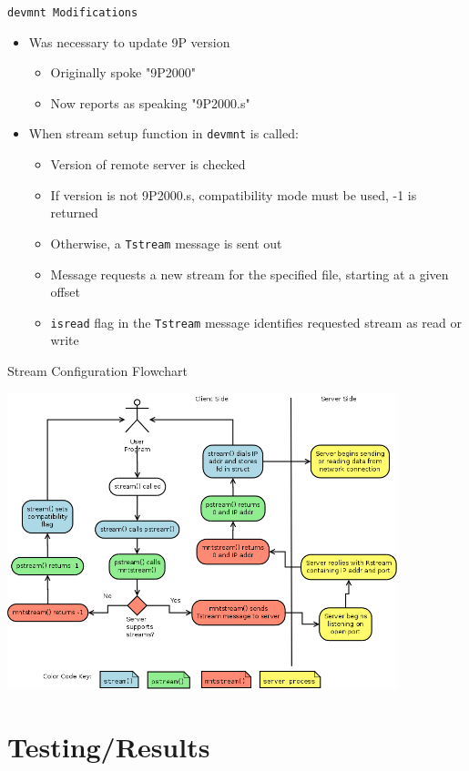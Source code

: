 \documentclass[11pt,compress]{beamer}
\begin{document}
\begin{frame}{\tt devmnt Modifications}
\begin{itemize}
	\item Was necessary to update 9P version
	\begin{itemize}
		\item Originally spoke "9P2000"
		\item Now reports as speaking "9P2000.s"
	\end{itemize}
	\item When stream setup function in {\tt devmnt} is called:
	\begin{itemize}
		\item Version of remote server is checked
		\item If version is not 9P2000.s, compatibility mode must be used, -1 is returned
		\item Otherwise, a {\tt Tstream} message is sent out
		\item Message requests a new stream for the specified file, starting at a given offset
		\item {\tt isread} flag in the {\tt Tstream} message identifies requested stream as read or write
	\end{itemize}
\end{itemize}
\end{frame}

\begin{frame}{Stream Configuration Flowchart}
\begin{center}
	\includegraphics[width=0.85\textwidth]{flowchart.png}
\end{center}
\end{frame}

\section{Testing/Results}
\end{document}
